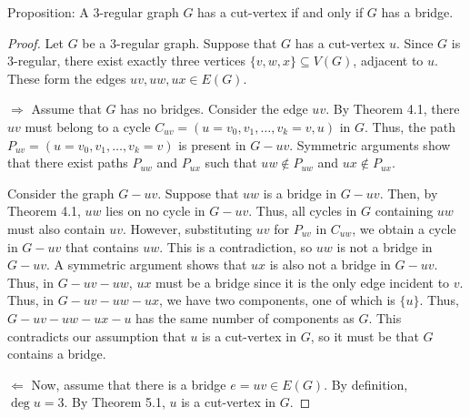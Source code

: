 \documentclass[12pt]{article}
\begin{document}
\newpage{} Proposition: A $3$-regular graph $G$ has a cut-vertex if and only if $G$ has a bridge.

\begin{proof}
Let $G$ be a 3-regular graph.
Suppose that $G$ has a cut-vertex $u$.
Since $G$ is 3-regular, there exist exactly three vertices $\{v, w, x\} \subseteq V(G)$, adjacent to $u$.
These form the edges $uv, uw, ux \in E(G)$.

$\Longrightarrow$ Assume that $G$ has no bridges.
Consider the edge $uv$.
By Theorem 4.1, there $uv$ must belong to a cycle $C_{uv} = (u = v_0, v_1, \dots, v_k = v, u)$ in $G$.
Thus, the path $P_{uv} = (u = v_0, v_1, \dots, v_k = v)$ is present in $G - uv$.
Symmetric arguments show that there exist paths $P_{uw}$ and $P_{ux}$ such that $uw \notin P_{uw}$ and $ux \notin P_{ux}$.

Consider the graph $G - uv$.
Suppose that $uw$ is a bridge in $G-uv$. 
Then, by Theorem 4.1, $uw$ lies on no cycle in $G-uv$.
Thus, all cycles in $G$ containing $uw$ must also contain $uv$.
However, substituting $uv$ for $P_{uv}$ in $C_{uw}$, we obtain a cycle in $G-uv$ that contains $uw$.
This is a contradiction, so $uw$ is not a bridge in $G-uv$.
A symmetric argument shows that $ux$ is also not a bridge in $G-uv$.
Thus, in $G - uv - uw$, $ux$ must be a bridge since it is the only edge incident to $v$.
Thus, in $G - uv - uw - ux$, we have two components, one of which is $\{u\}$.
Thus, $G - uv - uw - ux - u$ has the same number of components as $G$.
This contradicts our assumption that $u$ is a cut-vertex in $G$, so it must be that $G$ contains a bridge.

$\Longleftarrow$ Now, assume that there is a bridge $e = uv \in E(G)$.
By definition, $\deg u = 3$.
By Theorem 5.1, $u$ is a cut-vertex in $G$.
\end{proof}

\newpage
\end{document}
